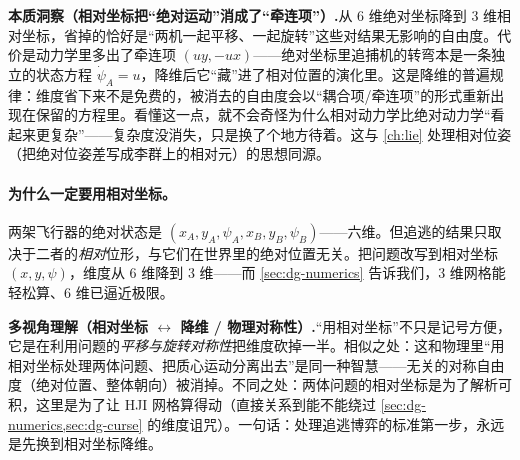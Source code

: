 \begin{note}
\textbf{本质洞察（相对坐标把“绝对运动”消成了“牵连项”）.}\;从 6 维绝对坐标降到 3 维相对坐标，省掉的恰好是“两机一起平移、一起旋转”这些对结果无影响的自由度。代价是动力学里多出了牵连项 $(uy,-ux)$——绝对坐标里追捕机的转弯本是一条独立的状态方程 $\dot\psi_A=u$，降维后它“藏”进了相对位置的演化里。这是降维的普遍规律：维度省下来不是免费的，被消去的自由度会以“耦合项/牵连项”的形式重新出现在保留的方程里。看懂这一点，就不会奇怪为什么相对动力学比绝对动力学“看起来更复杂”——复杂度没消失，只是换了个地方待着。这与 \cref{ch:lie} 处理相对位姿（把绝对位姿差写成李群上的相对元）的思想同源。
\end{note}

\paragraph{为什么一定要用相对坐标。}
两架飞行器的绝对状态是 $(x_A,y_A,\psi_A,x_B,y_B,\psi_B)$——六维。但追逃的结果只取决于二者的\emph{相对}位形，与它们在世界里的绝对位置无关。把问题改写到相对坐标 $(x,y,\psi)$，维度从 6 维降到 3 维——而 \cref{sec:dg-numerics} 告诉我们，3 维网格能轻松算、6 维已逼近极限。

\begin{note}
\textbf{多视角理解（相对坐标 $\leftrightarrow$ 降维 / 物理对称性）.}\;“用相对坐标”不只是记号方便，它是在利用问题的\emph{平移与旋转对称性}把维度砍掉一半。相似之处：这和物理里“用相对坐标处理两体问题、把质心运动分离出去”是同一种智慧——无关的对称自由度（绝对位置、整体朝向）被消掉。不同之处：两体问题的相对坐标是为了解析可积，这里是为了让 HJI 网格算得动（直接关系到能不能绕过 \cref{sec:dg-numerics,sec:dg-curse} 的维度诅咒）。一句话：处理追逃博弈的标准第一步，永远是先换到相对坐标降维。
\end{note}

